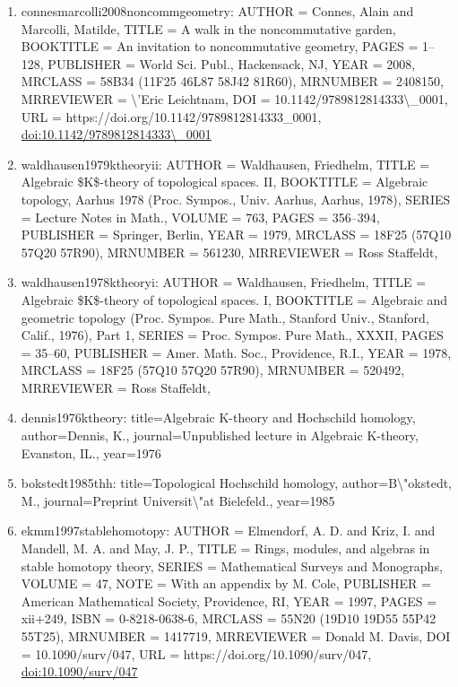\documentclass[11pt]{article}
\begin{document}
\begin{enumerate}[leftmargin=*]
  \item connesmarcolli2008noncommgeometry: AUTHOR = Connes, Alain and Marcolli, Matilde, TITLE = A walk in the noncommutative garden, BOOKTITLE = An invitation to noncommutative geometry, PAGES = 1--128, PUBLISHER = World Sci. Publ., Hackensack, NJ, YEAR = 2008, MRCLASS = 58B34 (11F25 46L87 58J42 81R60), MRNUMBER = 2408150, MRREVIEWER = \textbackslash{}'Eric Leichtnam, DOI = 10.1142/9789812814333\textbackslash{}\_0001, URL = https://doi.org/10.1142/9789812814333\_0001, \href{https://doi.org/10.1142/9789812814333\textbackslash{}\_0001}{doi:10.1142/9789812814333\textbackslash{}\_0001}
  \item waldhausen1979ktheoryii: AUTHOR = Waldhausen, Friedhelm, TITLE = Algebraic \$K\$-theory of topological spaces. II, BOOKTITLE = Algebraic topology, Aarhus 1978 (Proc. Sympos., Univ. Aarhus, Aarhus, 1978), SERIES = Lecture Notes in Math., VOLUME = 763, PAGES = 356--394, PUBLISHER = Springer, Berlin, YEAR = 1979, MRCLASS = 18F25 (57Q10 57Q20 57R90), MRNUMBER = 561230, MRREVIEWER = Ross Staffeldt,
  \item waldhausen1978ktheoryi: AUTHOR = Waldhausen, Friedhelm, TITLE = Algebraic \$K\$-theory of topological spaces. I, BOOKTITLE = Algebraic and geometric topology (Proc. Sympos. Pure Math., Stanford Univ., Stanford, Calif., 1976), Part 1, SERIES = Proc. Sympos. Pure Math., XXXII, PAGES = 35--60, PUBLISHER = Amer. Math. Soc., Providence, R.I., YEAR = 1978, MRCLASS = 18F25 (57Q10 57Q20 57R90), MRNUMBER = 520492, MRREVIEWER = Ross Staffeldt,
  \item dennis1976ktheory: title=Algebraic K-theory and Hochschild homology, author=Dennis, K., journal=Unpublished lecture in Algebraic K-theory, Evanston, IL., year=1976
  \item bokstedt1985thh: title=Topological Hochschild homology, author=B\textbackslash{}"okstedt, M., journal=Preprint Universit\textbackslash{}"at Bielefeld., year=1985
  \item ekmm1997stablehomotopy: AUTHOR = Elmendorf, A. D. and Kriz, I. and Mandell, M. A. and May, J. P., TITLE = Rings, modules, and algebras in stable homotopy theory, SERIES = Mathematical Surveys and Monographs, VOLUME = 47, NOTE = With an appendix by M. Cole, PUBLISHER = American Mathematical Society, Providence, RI, YEAR = 1997, PAGES = xii+249, ISBN = 0-8218-0638-6, MRCLASS = 55N20 (19D10 19D55 55P42 55T25), MRNUMBER = 1417719, MRREVIEWER = Donald M. Davis, DOI = 10.1090/surv/047, URL = https://doi.org/10.1090/surv/047, \href{https://doi.org/10.1090/surv/047}{doi:10.1090/surv/047}

\end{enumerate}
\end{document}
